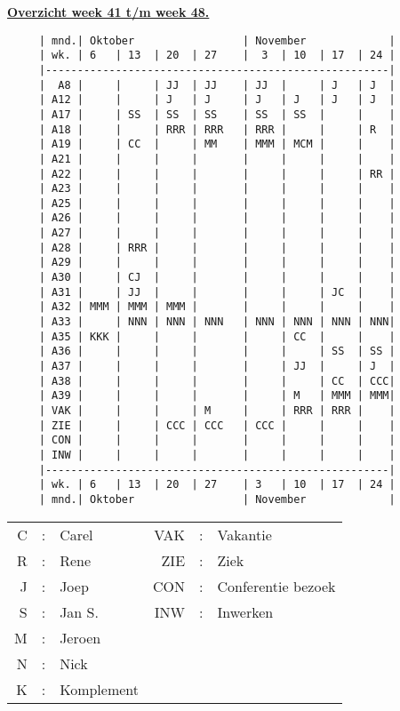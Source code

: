 {
 \bf
 \underline{Overzicht week 41 t/m week 48.}\\ 
 \begin{verbatim}
     | mnd.| Oktober                 | November             |
     | wk. | 6   | 13  | 20  | 27    |  3  | 10  | 17  | 24 |
     |------------------------------------------------------|
     |  A8 |     |     | JJ  | JJ    | JJ  |     | J   | J  |
     | A12 |     |     | J   | J     | J   | J   | J   | J  |
     | A17 |     | SS  | SS  | SS    | SS  | SS  |     |    |
     | A18 |     |     | RRR | RRR   | RRR |     |     | R  |
     | A19 |     | CC  |     | MM    | MMM | MCM |     |    |
     | A21 |     |     |     |       |     |     |     |    |
     | A22 |     |     |     |       |     |     |     | RR |
     | A23 |     |     |     |       |     |     |     |    |
     | A25 |     |     |     |       |     |     |     |    |
     | A26 |     |     |     |       |     |     |     |    |
     | A27 |     |     |     |       |     |     |     |    |
     | A28 |     | RRR |     |       |     |     |     |    |
     | A29 |     |     |     |       |     |     |     |    |
     | A30 |     | CJ  |     |       |     |     |     |    |
     | A31 |     | JJ  |     |       |     |     | JC  |    |
     | A32 | MMM | MMM | MMM |       |     |     |     |    |
     | A33 |     | NNN | NNN | NNN   | NNN | NNN | NNN | NNN|
     | A35 | KKK |     |     |       |     | CC  |     |    |
     | A36 |     |     |     |       |     |     | SS  | SS |
     | A37 |     |     |     |       |     | JJ  |     | J  |
     | A38 |     |     |     |       |     |     | CC  | CCC|
     | A39 |     |     |     |       |     | M   | MMM | MMM|
     | VAK |     |     |     | M     |     | RRR | RRR |    |
     | ZIE |     |     | CCC | CCC   | CCC |     |     |    |
     | CON |     |     |     |       |     |     |     |    |
     | INW |     |     |     |       |     |     |     |    |
     |------------------------------------------------------|
     | wk. | 6   | 13  | 20  | 27    | 3   | 10  | 17  | 24 |
     | mnd.| Oktober                 | November             |
 \end{verbatim}
 \rm
 \hspace{10mm}    
 \normalsize
 \begin{tabular}{rcp{6em}rcl}
  C&:&Carel             &VAK&:&Vakantie              \\
  R&:&Rene              &ZIE&:&Ziek                  \\
  J&:&Joep              &CON&:&Conferentie bezoek    \\
  S&:&Jan S.            &INW&:&Inwerken              \\
  M&:&Jeroen            &   & &                      \\
  N&:&Nick              &   & &                      \\ 
  K&:&Komplement        &   & &                      \\
 \end{tabular}
}
